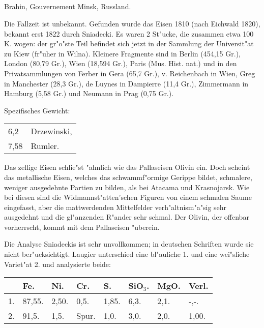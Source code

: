 \documentclass[a4paper, 11pt, oneside]{article}
\begin{document}
\subsection{}
\LARGE
\paragraph{}
Brahin, Gouvernement Minsk, Russland.

Die Fallzeit ist unbekannt. Gefunden wurde das Eisen 1810 (nach Eichwald 1820), bekannt erst 1822 durch Sniadecki. Es waren 2 St"ucke, die zusammen etwa 100 K. wogen: der gr"o"ste Teil befindet sich jetzt in der Sammlung der Universit"at zu Kiew (fr"uher in Wilna). Kleinere Fragmente sind in Berlin (454,15 Gr.), London (80,79 Gr.), Wien (18,594 Gr.), Paris (Mus. Hist. nat.) und in den Privatsammlungen von Ferber in Gera (65,7 Gr.), v. Reichenbach in Wien, Greg in Manchester (28,3 Gr.), de Luynes in Dampierre (11,4 Gr.), Zimmermann in Hamburg (5,58 Gr.) und Neumann in Prag (0,75 Gr.).

Spezifisches Gewicht:  
\begin{table}[!ht]
    \centering\swabfamily\Large
    \begin{tabular}{l l}
        6,2 & Drzewinski,\\
        7,58 & Rumler.
    \end{tabular}
\end{table}

Das zellige Eisen schlie"st "ahnlich wie das Pallaseisen Olivin ein. Doch scheint das metallische Eisen, welches das schwammf"ormige Gerippe bildet, schmalere, weniger ausgedehnte Partien zu bilden, als bei Atacama und Krasnojarsk. Wie bei diesen sind die Widmannst"atten'schen Figuren von einem schmalen Saume eingefasst, aber die mattwerdenden Mittelfelder verh"altnism"a"sig sehr ausgedehnt und die gl"anzenden R"ander sehr schmal. Der Olivin, der offenbar vorherrscht, kommt mit dem Pallaseisen "uberein.

Die Analyse Sniadeckis ist sehr unvollkommen; in deutschen Schriften wurde sie nicht ber"ucksichtigt. Laugier unterschied eine bl"auliche 1. und eine wei"sliche Variet"at 2. und analysierte beide:
\begin{table}[H]
    \centering\swabfamily\Large
    \begin{tabular}{l l l l l l l l}
         & Fe. & Ni. & Cr. & S. & SiO$_{3}$. & MgO. & Verl. \\ \hline
        1. & 87,55. & 2,50. & 0,5. & 1,85. & 6,3. & 2,1. & -,-. \\
        2. & 91,5. & 1,5. & Spur. & 1,0. & 3,0. & 2,0. & 1,00. \\
    \end{tabular}
\end{table}
\end{document}
